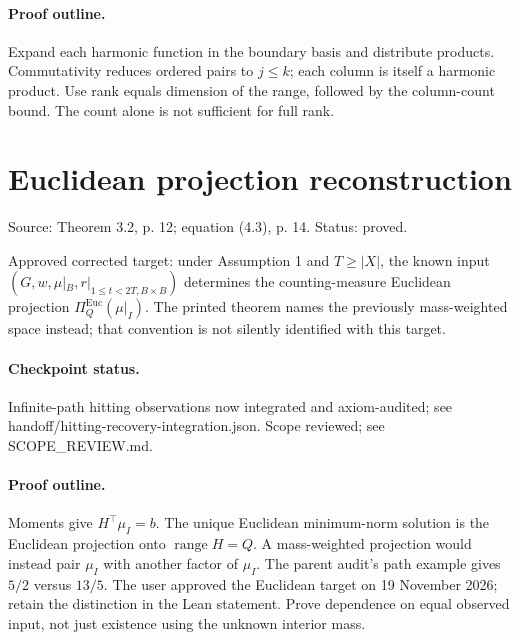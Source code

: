 \paragraph{Proof outline.}

Expand each harmonic function in the boundary basis and distribute products. Commutativity reduces ordered pairs to $j\leq k$; each column is itself a harmonic product. Use rank equals dimension of the range, followed by the column-count bound. The count alone is not sufficient for full rank.
\nodebreak
\section{Euclidean projection reconstruction}
Source: Theorem 3.2, p. 12; equation (4.3), p. 14. Status: proved.
\begin{theorem}\label{projection}

Approved corrected target: under Assumption 1 and $T\geq|X|$, the known input $(G,w,\mu|_B,r|_{1\leq t<2T,B\times B})$ determines the counting-measure Euclidean projection $\Pi_Q^{\mathrm{Euc}}(\mu|_I)$. The printed theorem names the previously mass-weighted space instead; that convention is not silently identified with this target.


\paragraph{Checkpoint status.}
Infinite-path hitting observations now integrated and axiom-audited; see handoff/hitting-recovery-integration.json. Scope reviewed; see SCOPE\_REVIEW.md.
\end{theorem}
\paragraph{Proof outline.}

Moments give $H^\top\mu_I=b$. The unique Euclidean minimum-norm solution is the Euclidean projection onto $\operatorname{range}H=Q$. A mass-weighted projection would instead pair $\mu_I$ with another factor of $\mu_I$. The parent audit's path example gives $5/2$ versus $13/5$. The user approved the Euclidean target on 19 November 2026; retain the distinction in the Lean statement. Prove dependence on equal observed input, not just existence using the unknown interior mass.
\nodebreak
